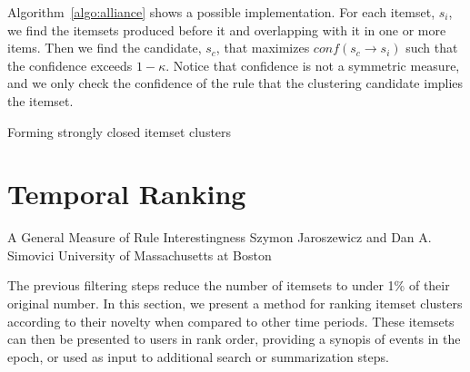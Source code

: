 \documentclass[letterpaper,12pt,titlepage,oneside,final]{book}
\begin{document}
Algorithm~\ref{algo:alliance}  shows a possible implementation.
For each itemset, $s_i$, we find the itemsets produced before it
and overlapping with it in one or more items.
Then we find the candidate, $s_c$, that maximizes
$conf(s_c \rightarrow s_i)$ such that the confidence exceeds $1-\kappa$.
Notice that confidence is not a symmetric measure,
and we only check the confidence of the rule that the clustering candidate
implies the itemset. 


\begin{algorithm}
\SetAlgoLined
\LinesNumbered
{} 
\;
\caption{Forming strongly closed itemset clusters}
\label{algo:alliance}
\end{algorithm}




\section{Temporal Ranking}
\label{sec:rank}

A General Measure of Rule Interestingness
Szymon Jaroszewicz and Dan A. Simovici
University of Massachusetts at Boston

The previous filtering steps reduce the number of itemsets to under 1\% of their
original number.
In this section, we present a method for ranking itemset clusters according to
their novelty when compared to other time periods.
These itemsets can then be presented to users in rank order, providing a
synopis of events in the epoch, or used as input to additional search or
summarization steps.
\end{document}
